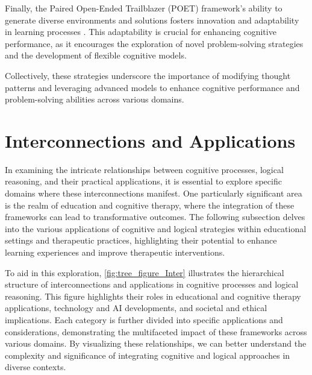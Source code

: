 Finally, the Paired Open-Ended Trailblazer (POET) framework's ability to generate diverse environments and solutions fosters innovation and adaptability in learning processes \cite{wang2019pairedopenendedtrailblazerpoet}. This adaptability is crucial for enhancing cognitive performance, as it encourages the exploration of novel problem-solving strategies and the development of flexible cognitive models.



Collectively, these strategies underscore the importance of modifying thought patterns and leveraging advanced models to enhance cognitive performance and problem-solving abilities across various domains.












\section{Interconnections and Applications} \label{sec:Interconnections and Applications}

 


In examining the intricate relationships between cognitive processes, logical reasoning, and their practical applications, it is essential to explore specific domains where these interconnections manifest. One particularly significant area is the realm of education and cognitive therapy, where the integration of these frameworks can lead to transformative outcomes. The following subsection delves into the various applications of cognitive and logical strategies within educational settings and therapeutic practices, highlighting their potential to enhance learning experiences and improve therapeutic interventions. 

To aid in this exploration, \autoref{fig:tree_figure_Inter} illustrates the hierarchical structure of interconnections and applications in cognitive processes and logical reasoning. This figure highlights their roles in educational and cognitive therapy applications, technology and AI developments, and societal and ethical implications. Each category is further divided into specific applications and considerations, demonstrating the multifaceted impact of these frameworks across various domains. By visualizing these relationships, we can better understand the complexity and significance of integrating cognitive and logical approaches in diverse contexts.

